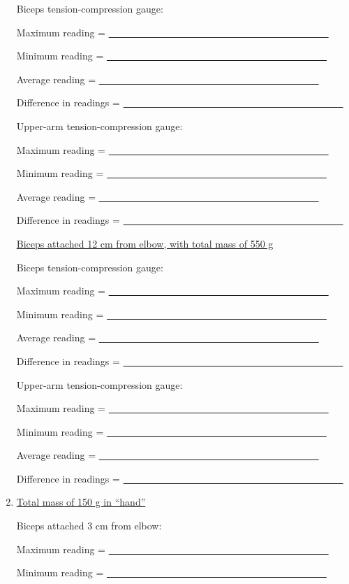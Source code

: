 \begin{enumerate}[label=\arabic*.]
Biceps tension-compression gauge:

Maximum reading = \ul{~~~~~~~~~~~~~~~~~~~~~~~~~~~~~~~~~~~~~~~~~~~~~}

Minimum reading = \ul{~~~~~~~~~~~~~~~~~~~~~~~~~~~~~~~~~~~~~~~~~~~~~}

Average reading = \ul{~~~~~~~~~~~~~~~~~~~~~~~~~~~~~~~~~~~~~~~~~~~~~}

Difference in readings = \ul{~~~~~~~~~~~~~~~~~~~~~~~~~~~~~~~~~~~~~~~~~~~~~}

Upper-arm tension-compression gauge:

Maximum reading = \ul{~~~~~~~~~~~~~~~~~~~~~~~~~~~~~~~~~~~~~~~~~~~~~}

Minimum reading = \ul{~~~~~~~~~~~~~~~~~~~~~~~~~~~~~~~~~~~~~~~~~~~~~}

Average reading = \ul{~~~~~~~~~~~~~~~~~~~~~~~~~~~~~~~~~~~~~~~~~~~~~}

Difference in readings = \ul{~~~~~~~~~~~~~~~~~~~~~~~~~~~~~~~~~~~~~~~~~~~~~}

\ul{Biceps attached 12 cm from elbow, with total mass of 550 g}

Biceps tension-compression gauge:

Maximum reading = \ul{~~~~~~~~~~~~~~~~~~~~~~~~~~~~~~~~~~~~~~~~~~~~~}

Minimum reading = \ul{~~~~~~~~~~~~~~~~~~~~~~~~~~~~~~~~~~~~~~~~~~~~~}

Average reading = \ul{~~~~~~~~~~~~~~~~~~~~~~~~~~~~~~~~~~~~~~~~~~~~~}

Difference in readings = \ul{~~~~~~~~~~~~~~~~~~~~~~~~~~~~~~~~~~~~~~~~~~~~~}

Upper-arm tension-compression gauge:

Maximum reading = \ul{~~~~~~~~~~~~~~~~~~~~~~~~~~~~~~~~~~~~~~~~~~~~~}

Minimum reading = \ul{~~~~~~~~~~~~~~~~~~~~~~~~~~~~~~~~~~~~~~~~~~~~~}

Average reading = \ul{~~~~~~~~~~~~~~~~~~~~~~~~~~~~~~~~~~~~~~~~~~~~~}

Difference in readings = \ul{~~~~~~~~~~~~~~~~~~~~~~~~~~~~~~~~~~~~~~~~~~~~~}

\item \ul{Total mass of 150 g in ``hand''}

Biceps attached 3 cm from elbow:

Maximum reading = \ul{~~~~~~~~~~~~~~~~~~~~~~~~~~~~~~~~~~~~~~~~~~~~~}

Minimum reading = \ul{~~~~~~~~~~~~~~~~~~~~~~~~~~~~~~~~~~~~~~~~~~~~~}


\end{enumerate}
